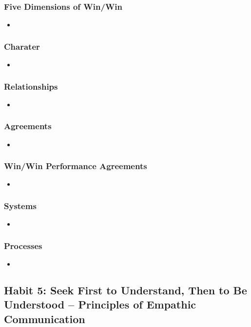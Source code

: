 \documentclass[11pt]{article}
\begin{document}
\subsubsection{Five Dimensions of Win/Win}
\begin{itemize}
\item 
\end{itemize}
\subsubsection{Charater}
\begin{itemize}
\item 
\end{itemize}
\subsubsection{Relationships}
\begin{itemize}
\item 
\end{itemize}
\subsubsection{Agreements}
\begin{itemize}
\item 
\end{itemize}
\subsubsection{Win/Win Performance Agreements}
\begin{itemize}
\item 
\end{itemize}
\subsubsection{Systems}
\begin{itemize}
\item 
\end{itemize}
\subsubsection{Processes}
\begin{itemize}
\item 
\end{itemize}
\subsection{Habit 5: Seek First to Understand, Then to Be Understood -- Principles of Empathic Communication}
\end{document}

